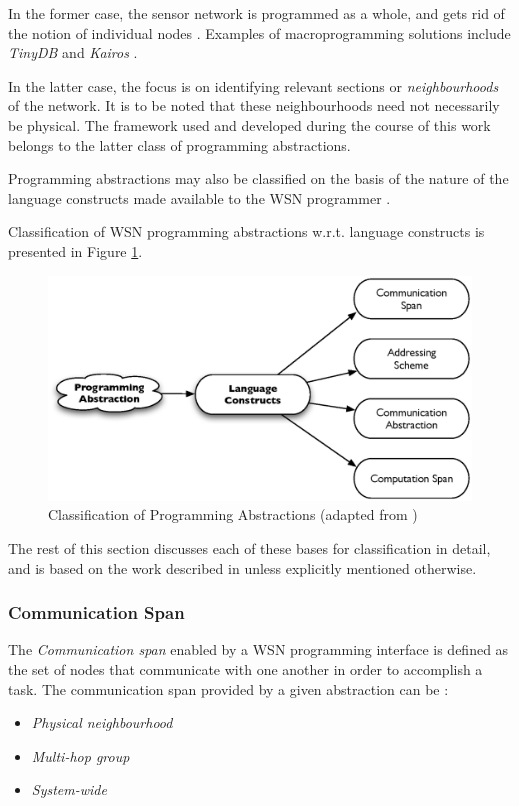 In the former case, the sensor network is programmed as a whole, and gets rid of
the notion of individual nodes \cite{mottola_middleware:2008}. Examples of
macroprogramming solutions include \emph{TinyDB} \cite{madden_TinyDB:2005} and
\emph{Kairos} \cite{gummadi_Kairos:2005}. 

In the latter case, the focus is on identifying relevant sections or
\emph{neighbourhoods} of the network. It is to be noted that these neighbourhoods
need not necessarily be physical. The framework used and developed during the
course of this work belongs to the latter class of programming abstractions.

Programming abstractions may also be classified on the basis of the
nature of the language constructs made available to the WSN programmer
\cite{mottola_middleware:2008}. 

Classification of WSN programming abstractions w.r.t. language constructs is
presented in Figure \ref{Fig:ProgrAbstrClassification}.

\begin{figure}
\centering
\includegraphics[scale=0.65]{img/ProgAbstr_Classification.eps}
\caption{Classification of Programming Abstractions (adapted from \cite{mottola_middleware:2008})} 
\label{Fig:ProgrAbstrClassification}
\end{figure} 

The rest of this section discusses each of these bases for classification in
detail, and is based on the work described in \cite{mottola_middleware:2008}
unless explicitly mentioned otherwise.

\subsubsection{Communication Span}

The \emph{Communication span} enabled by a WSN programming interface is defined
as the set of nodes that communicate with one another in order to accomplish a
task. The communication span provided by a given abstraction can be
\cite{mottola_middleware:2008}:
\begin{itemize}
  \item \emph{Physical neighbourhood}
  \item \emph{Multi-hop group}
  \item \emph{System-wide}
\end{itemize}

